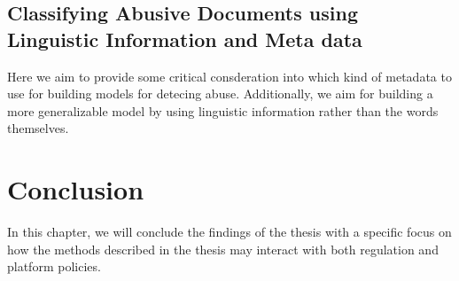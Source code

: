 \subsection{Classifying Abusive Documents using Linguistic Information and Meta data}
Here we aim to provide some critical consderation into which kind of metadata to use for building models for detecing abuse. Additionally, we aim for building a more generalizable model by using linguistic information rather than the words themselves.

\section{Conclusion}
In this chapter, we will conclude the findings of the thesis with a specific focus on how the methods described in the thesis may interact with both regulation and platform policies.
